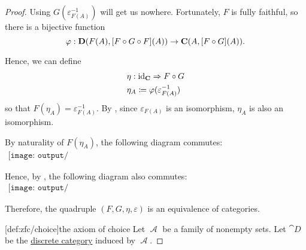 \begin{proof}
  Using \( G(\varepsilon_{F(A)}^{-1}) \) will get us nowhere. Fortunately, \( F \) is fully faithful, so there is a bijective function
  \begin{equation*}
    \varphi: \cat{D}(F(A), [F \bincirc G \bincirc F](A)) \to \cat{C}(A, [F \bincirc G](A)).
  \end{equation*}

  Hence, we can define
  \begin{equation*}
    \begin{aligned}
      &\eta: \id_{\cat{C}} \Rightarrow F \bincirc G \\
      &\eta_A \coloneqq \varphi(\varepsilon_{F(A)}^{-1})
    \end{aligned}
  \end{equation*}
  so that \( F(\eta_A) = \varepsilon_{F(A)}^{-1} \). By , since \( \varepsilon_{F(A)} \) is an isomorphism, \( \eta_A \) is also an isomorphism.

  By naturality of \( F(\eta_A) \), the following diagram commutes:
  \begin{equation}\label{eq:thm:fully_faithful_and_essentially_surjective_functor_induces_equivalence/varepsilon_image_nat}
    \begin{aligned}
      \texttt{[image: output/thm\_\_fully\_faithful\_and\_essentially\_surjective\_functor\_induces\_equivalence.pdf]}
    \end{aligned}
  \end{equation}

  Hence, by , the following diagram also commutes:
  \begin{equation}\label{eq:thm:fully_faithful_and_essentially_surjective_functor_induces_equivalence/varepsilon_source_nat}
    \begin{aligned}
      \texttt{[image: output/thm\_\_fully\_faithful\_and\_essentially\_surjective\_functor\_induces\_equivalence.pdf]}
    \end{aligned}
  \end{equation}

  Therefore, the quadruple \( (F, G, \eta, \varepsilon) \) is an equivalence of categories.

  [def:zfc/choice]{the axiom of choice} Let \( \mscrA \) be a family of nonempty sets. Let \( \cat{D} \) be the \hyperref[def:discrete_category]{discrete category} induced by \( \mscrA \).


\end{proof}
